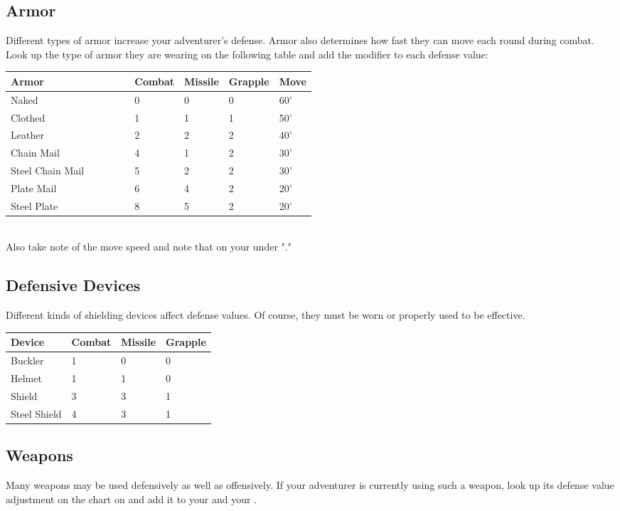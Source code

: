 \begin{multicols*}{2}
\subsection{Armor}
Different types of armor increase your adventurer's defense. Armor also determines how fast they can move each round during combat. Look up the type of armor they are wearing on the following table and add the modifier to each defense value:

\begin{normboxc}
\small
\begin{tabular}{@{}l p{0.125\linewidth} p{0.125\linewidth} p{0.125\linewidth} p{0.125\linewidth}}
\textbf{Armor} & \textbf{Combat} & \textbf{Missile} & \textbf{Grapple} & \textbf{Move}\\
\midrule
Naked & 0 & 0 & 0 & 60'\\
Clothed & 1 & 1 & 1 & 50'\\
Leather & 2 & 2 & 2 & 40'\\
Chain Mail & 4 & 1 & 2 & 30'\\
Steel Chain Mail  & 5 & 2 & 2 & 30'\\
Plate Mail & 6 & 4 & 2 & 20'\\
Steel Plate & 8 & 5 & 2 & 20'\\
\end{tabular}
\end{normboxc}\\
Also take note of the move speed and note that on your  under "."
\subsection{Defensive Devices}
Different kinds of shielding devices affect defense values. Of course, they must be worn or properly used to be effective.
\begin{normboxc}
\small
\begin{tabular}{l l l l}
\textbf{Device}  & \textbf{Combat}  & \textbf{Missile}  & \textbf{Grapple} \\
\midrule
Buckler & 1 & 0 & 0\\
Helmet & 1 & 1 & 0\\
Shield & 3 & 3 & 1\\
Steel Shield & 4 & 3 & 1\\
\end{tabular}
\end{normboxc}
\subsection{Weapons}
Many weapons may be used defensively as well as offensively. If your adventurer is currently using such a weapon, look up its defense value adjustment on the  chart on  and add it to your \CDV and your \GDV.
\end{multicols*}